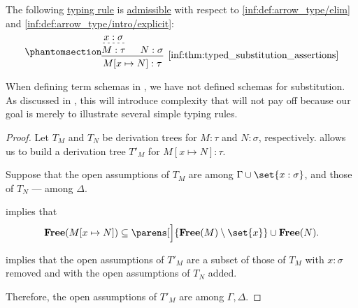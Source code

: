 \begin{proposition}\label{thm:typed_substitution_assertions}
  The following \hyperref[con:typing_rule]{typing rule} is \hyperref[con:inference_rule_admissibility]{admissible} with respect to \ref{inf:def:arrow_type/elim} and \ref{inf:def:arrow_type/intro/explicit}:
  \begin{equation*}\taglabel[\ensuremath{ Subst }]{inf:thm:typed_substitution_assertions}
    \begin{prooftree}
      \hypo{ x: \sigma }
      \infer[dashed]1{ M: \tau }

      \hypo{ N: \sigma }
      \infer2[\ref{inf:thm:typed_substitution_assertions}]{ M[x \mapsto N]: \tau }.
    \end{prooftree}
  \end{equation*}
\end{proposition}
\begin{comments}
  \item When defining term schemas in , we have not defined schemas for substitution. As discussed in , this will introduce complexity that will not pay off because our goal is merely to illustrate several simple typing rules.
\end{comments}
\begin{proof}
  Let \( T_M \) and \( T_N \) be derivation trees for \( M: \tau \) and \( N: \sigma \), respectively.  allows us to build a derivation tree \( T'_M \) for \( M[x \mapsto N]: \tau \).

  Suppose that the open assumptions of \( T_M \) are among \( \Gamma \cup \set{ x: \sigma } \), and those of \( T_N \) --- among \( \Delta \).

   implies that
  \begin{equation*}
    \op*{Free}(M[x \mapsto N]) \subseteq \parens[\Big]{ \op*{Free}(M) \setminus \set{ x } } \cup \op*{Free}(N).
  \end{equation*}

   implies that the open assumptions of \( T'_M \) are a subset of those of \( T_M \) with \( x: \sigma \) removed and with the open assumptions of \( T_N \) added.

  Therefore, the open assumptions of \( T'_M \) are among \( \Gamma, \Delta \).
\end{proof}

